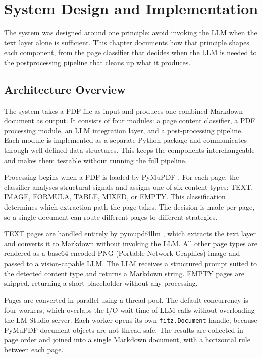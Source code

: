 \chapter{System Design and Implementation}

The system was designed around one principle: avoid invoking the LLM when the
text layer alone is sufficient. This chapter documents how that principle
shapes each component, from the page classifier that decides when the LLM is
needed to the postprocessing pipeline that cleans up what it produces.

\section{Architecture Overview}

The system takes a PDF file as input and produces one combined Markdown document as output.
It consists of four modules: a page content classifier, a PDF processing module, an LLM integration layer, and a post-processing pipeline.
Each module is implemented as a separate Python package and communicates through well-defined data structures.
This keeps the components interchangeable and makes them testable without running the full pipeline.

Processing begins when a PDF is loaded by PyMuPDF \autocite{pymupdf}.
For each page, the classifier analyses structural signals and assigns one of six content types: TEXT, IMAGE, FORMULA, TABLE, MIXED, or EMPTY.
This classification determines which extraction path the page takes.
The decision is made per page, so a single document can route different pages to different strategies.

TEXT pages are handled entirely by pymupdf4llm \autocite{pymupdf4llm}, which extracts the text layer and converts it to Markdown without invoking the LLM.
All other page types are rendered as a base64-encoded PNG (Portable Network Graphics) image and passed to a vision-capable LLM.
The LLM receives a structured prompt suited to the detected content type and returns a Markdown string.
EMPTY pages are skipped, returning a short placeholder without any processing.

Pages are converted in parallel using a thread pool. The default concurrency is four workers, which overlaps the I/O wait time of LLM calls without overloading the LM Studio server. Each worker opens its own \texttt{fitz.Document} handle, because PyMuPDF document objects are not thread-safe. The results are collected in page order and joined into a single Markdown document, with a horizontal rule between each page.

